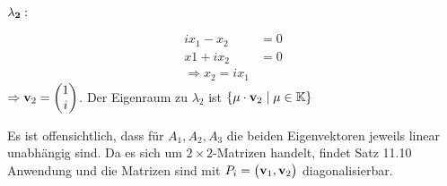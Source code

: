 \documentclass{../mfa}
\begin{document}
$\mathbf{\lambda_2:}$
\par 
\begin{align*}
   ix_1  -x_2 &= 0 \\
   x1  + ix_2 &= 0 \\
   \Rightarrow x_2 = ix_1
\end{align*}
$\Rightarrow \v{2} = \begin{pmatrix} 1 \\ i \end{pmatrix}$. Der Eigenraum zu
   $\lambda_2$ ist $\{\mu \cdot \v{2} \mid \mu \in \mathbb{K}\}$

Es ist offensichtlich, dass für $A_1, A_2, A_3$ die beiden Eigenvektoren jeweils
linear unabhängig sind. Da es sich um $2\times 2$-Matrizen handelt, findet Satz
11.10 Anwendung und die Matrizen sind mit $P_i = \begin{pmatrix}\v{1}, \v{2}
\end{pmatrix}$ diagonalisierbar.
\end{document}
